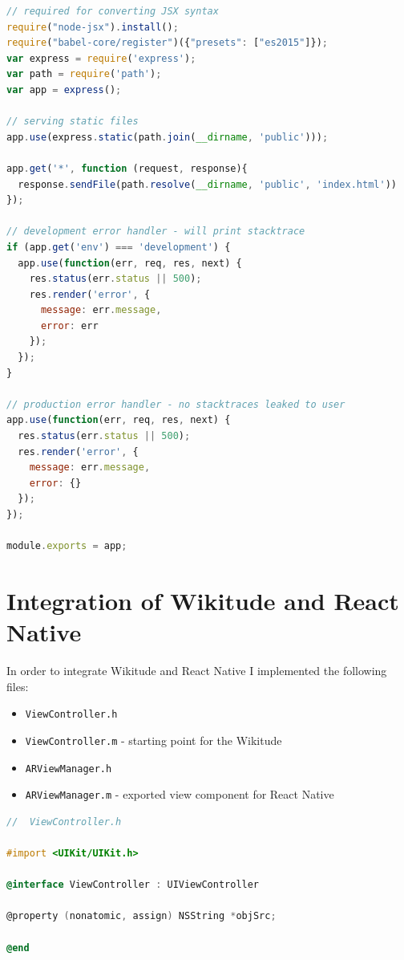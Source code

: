 \documentclass[thesis=M,english]{FITthesis}[2012/10/20]
\begin{document}
\begin{lstlisting}[language=JavaScript]
// required for converting JSX syntax
require("node-jsx").install();
require("babel-core/register")({"presets": ["es2015"]});
var express = require('express');
var path = require('path');
var app = express();

// serving static files
app.use(express.static(path.join(__dirname, 'public')));

app.get('*', function (request, response){
  response.sendFile(path.resolve(__dirname, 'public', 'index.html'))
});

// development error handler - will print stacktrace
if (app.get('env') === 'development') {
  app.use(function(err, req, res, next) {
    res.status(err.status || 500);
    res.render('error', {
      message: err.message,
      error: err
    });
  });
}

// production error handler - no stacktraces leaked to user
app.use(function(err, req, res, next) {
  res.status(err.status || 500);
  res.render('error', {
    message: err.message,
    error: {}
  });
});

module.exports = app;
\end{lstlisting}

\chapter{Integration of Wikitude and React Native}
\label{apendix:integration}
In order to integrate Wikitude and React Native I implemented the following files:
\begin{itemize}
\item \verb|ViewController.h| 
\item \verb|ViewController.m| - starting point for the Wikitude
\item \verb|ARViewManager.h|
\item \verb|ARViewManager.m| - exported view component for React Native
\end{itemize}

\begin{lstlisting}[language=C]
//  ViewController.h

#import <UIKit/UIKit.h>

@interface ViewController : UIViewController

@property (nonatomic, assign) NSString *objSrc;

@end

\end{lstlisting}
\end{document}
